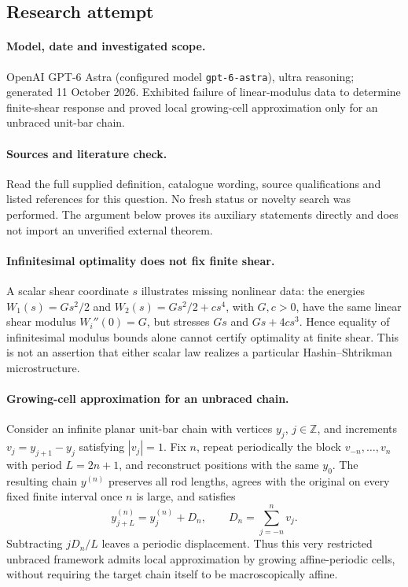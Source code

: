 \documentclass[11pt]{article}
\begin{document}
\subsection{Research attempt}
\paragraph{Model, date and investigated scope.}
OpenAI GPT-6 Astra (configured model \texttt{gpt-6-astra}), ultra reasoning; generated 11 October 2026. Exhibited failure of linear-modulus data to determine finite-shear response and proved local growing-cell approximation only for an unbraced unit-bar chain.

\paragraph{Sources and literature check.}
Read the full supplied definition, catalogue wording, source qualifications and listed references for this question. No fresh status or novelty search was performed. The argument below proves its auxiliary statements directly and does not import an unverified external theorem.

\paragraph{Infinitesimal optimality does not fix finite shear.} A scalar shear coordinate \(s\) illustrates missing nonlinear data: the energies \(W_1(s)=Gs^2/2\) and \(W_2(s)=Gs^2/2+cs^4\), with \(G,c>0\), have the same linear shear modulus \(W_i''(0)=G\), but stresses \(Gs\) and \(Gs+4cs^3\). Hence equality of infinitesimal modulus bounds alone cannot certify optimality at finite shear. This is not an assertion that either scalar law realizes a particular Hashin--Shtrikman microstructure.
\paragraph{Growing-cell approximation for an unbraced chain.} Consider an infinite planar unit-bar chain with vertices \(y_j\), \(j\in\mathbb Z\), and increments \(v_j=y_{j+1}-y_j\) satisfying \(|v_j|=1\). Fix \(n\), repeat periodically the block \(v_{-n},\ldots,v_n\) with period \(L=2n+1\), and reconstruct positions with the same \(y_0\). The resulting chain \(y^{(n)}\) preserves all rod lengths, agrees with the original on every fixed finite interval once \(n\) is large, and satisfies
\[
 y^{(n)}_{j+L}=y^{(n)}_j+D_n,\qquad
 D_n=\sum_{j=-n}^n v_j.
\]
Subtracting \(jD_n/L\) leaves a periodic displacement. Thus this very restricted unbraced framework admits local approximation by growing affine-periodic cells, without requiring the target chain itself to be macroscopically affine.
\end{document}
